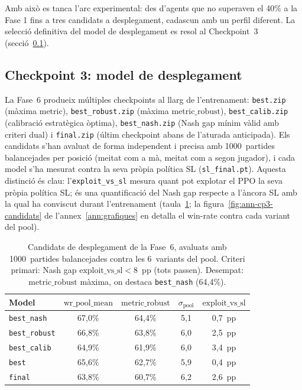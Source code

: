 Amb això es tanca l’arc experimental: des d’agents que no superaven el 40\% a la
Fase 1 fins a tres candidats a desplegament, cadascun amb un perfil diferent. 
La selecció definitiva del model de desplegament es resol al Checkpoint~3
(secció~\ref{sec:checkpoint3}).

\subsection{Checkpoint 3: model de desplegament}
\label{sec:checkpoint3}

La Fase~6 produeix múltiples checkpoints al llarg de l'entrenament: \texttt{best.zip}
(màxima \(\text{metric}\)), \texttt{best\_robust.zip} (màxima \(\text{metric\_robust}\)),
\texttt{best\_calib.zip} (calibració estratègica òptima), \texttt{best\_nash.zip} (Nash gap
mínim vàlid amb criteri dual) i \texttt{final.zip} (últim checkpoint abans de l'aturada
anticipada).
Els candidats s'han avaluat de forma independent i precisa amb 1000~partides balancejades
per posició (meitat com a mà, meitat com a segon jugador), i cada model s'ha mesurat contra
la seva pròpia política \ac{SL} (\texttt{sl\_final.pt}). Aquesta distinció és clau: l'\texttt{exploit\_vs\_sl}
mesura quant pot explotar el \ac{PPO} la seva pròpia política \ac{SL}; és una quantificació
del Nash gap respecte a l'àncora \ac{SL} amb la qual ha conviscut durant l'entrenament
(taula~\ref{tab:checkpoint3}; la figura~\ref{fig:ann-cp3-candidats} de
l'annex~\ref{ann:grafiques} en detalla el win-rate contra cada variant del pool).

\begin{table}[H]
  \centering
  \begin{tabular}{lcccc}
    \toprule
    Model & \(\text{wr\_pool\_mean}\) & \(\text{metric\_robust}\) & \(\sigma_{\text{pool}}\) & \(\text{exploit\_vs\_sl}\) \\
    \midrule
    \texttt{best\_nash}  & 67{,}0\% & 64{,}4\% & 5{,}1 & 0{,}7~pp \\
    \texttt{best\_robust} & 66{,}8\% & 63{,}8\% & 6{,}0 & 2{,}5~pp \\
    \texttt{best\_calib}  & 64{,}9\% & 61{,}9\% & 6{,}0 & 3{,}4~pp \\
    \texttt{best}        & 65{,}6\% & 62{,}7\% & 5{,}9 & 0{,}4~pp \\
    \texttt{final}       & 63{,}8\% & 60{,}7\% & 6{,}2 & 2{,}6~pp \\
    \bottomrule
  \end{tabular}
  \caption[Candidats de desplegament (Fase~6).]{Candidats de desplegament de la Fase~6, avaluats amb 1000~partides balancejades
           contra les 6~variants del pool. Criteri primari: Nash gap
           \(\text{exploit\_vs\_sl} < 8\)~pp (tots passen). Desempat: \(\text{metric\_robust}\)
           màxima, on destaca \texttt{best\_nash} (64{,}4\%).}%
  \label{tab:checkpoint3}
\end{table}

